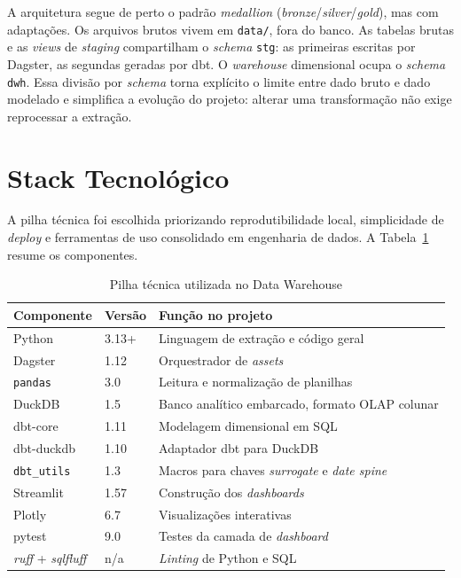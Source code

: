 A arquitetura segue de perto o padrão \textit{medallion} (\textit{bronze}/\textit{silver}/\textit{gold}), mas com adaptações. Os arquivos brutos vivem em \texttt{data/}, fora do banco. As tabelas brutas e as \textit{views} de \textit{staging} compartilham o \textit{schema} \texttt{stg}: as primeiras escritas por Dagster, as segundas geradas por dbt. O \textit{warehouse} dimensional ocupa o \textit{schema} \texttt{dwh}. Essa divisão por \textit{schema} torna explícito o limite entre dado bruto e dado modelado e simplifica a evolução do projeto: alterar uma transformação não exige reprocessar a extração.

\section{Stack Tecnológico}

A pilha técnica foi escolhida priorizando reprodutibilidade local, simplicidade de \textit{deploy} e ferramentas de uso consolidado em engenharia de dados. A Tabela~\ref{tab:stack} resume os componentes.

\begin{table}[htb]
\caption{Pilha técnica utilizada no Data Warehouse}
\label{tab:stack}
\centering
\small
\begin{tabular}{p{3.0cm} p{2.0cm} p{8.0cm}}
\hline
\textbf{Componente} & \textbf{Versão} & \textbf{Função no projeto} \\
\hline
Python & 3.13+ & Linguagem de extração e código geral \\
Dagster & 1.12 & Orquestrador de \textit{assets} \\
\texttt{pandas} & 3.0 & Leitura e normalização de planilhas \\
DuckDB & 1.5 & Banco analítico embarcado, formato OLAP colunar \\
dbt-core & 1.11 & Modelagem dimensional em SQL \\
dbt-duckdb & 1.10 & Adaptador dbt para DuckDB \\
\texttt{dbt\_utils} & 1.3 & Macros para chaves \textit{surrogate} e \textit{date spine} \\
Streamlit & 1.57 & Construção dos \textit{dashboards} \\
Plotly & 6.7 & Visualizações interativas \\
pytest & 9.0 & Testes da camada de \textit{dashboard} \\
\textit{ruff} + \textit{sqlfluff} & n/a & \textit{Linting} de Python e SQL \\
\hline
\end{tabular}
\end{table}

